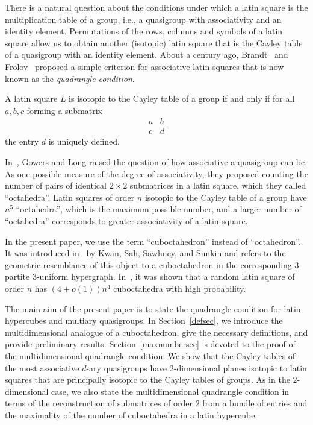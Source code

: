 \documentclass[a4paper]{article}
\begin{document}
There  is a natural question about the conditions under which a latin square is the multiplication table of a group, i.e., a quasigroup with associativity  and an identity element. Permutations of the rows, columns and symbols of a latin square  allow us to obtain another (isotopic) latin square that is the Cayley table of a quasigroup with an identity element.  About  a century ago, Brandt~\cite{brandt.qudrangle}  and  Frolov~\cite{frolov.groupCayley}  proposed a  simple criterion for associative latin squares that is now known as the \textit{quadrangle condition}. 
  
  
  
  
\begin{theorem} \label{BrandtFrolovthm}
A latin square $L$ is isotopic to the Cayley table of a group if and only if for all $a,b,c$ forming a  submatrix
$$
\begin{array}{cc}
a & b \\ c & d
\end{array}
$$
the entry $d$ is uniquely defined.
\end{theorem}


In~\cite{GowLong.approxgroups}, Gowers and Long raised the question of how associative a quasigroup  can be. As one possible measure of the degree of associativity, they proposed counting the number of pairs of identical $2 \times 2$ submatrices in a latin square, which they called ``octahedra''. Latin squares of order $n$  isotopic to the Cayley table of a group have $n^5$ ``octahedra'', which is the maximum possible number, and a larger number of ``octahedra''  corresponds to greater  associativity of a latin square.  

In the present paper, we use the term ``cuboctahedron'' instead of ``octahedron''. It was introduced in~\cite{KwanSahSaw.SubstrctLS}  by Kwan, Sah, Sawhney, and Simkin and refers to the  geometric  resemblance of this object  to a cuboctahedron in the corresponding $3$-partite $3$-uniform hypergraph.  In~\cite{KwanSahSaw.SubstrctLS},  it  was  shown that a random latin square of order $n$ has $ (4 + o (1))n^4$ cuboctahedra with high probability. 


The main aim of the present paper is to state the quadrangle condition for latin hypercubes and multiary quasigroups.   In Section~\ref{defsec}, we introduce the multidimensional analogue of a cuboctahedron,  give the necessary definitions, and provide preliminary results. Section~\ref{maxnumbersec} is devoted to the proof of the multidimensional  quadrangle condition.  We  show that the Cayley tables of the  most associative  $d$-ary quasigroups  have  $2$-dimensional planes  isotopic to latin squares that are principally isotopic to the Cayley tables of groups.  As in the $2$-dimensional case, we also state the multidimensional quadrangle condition  in terms of  the reconstruction of  submatrices of order $2$ from a bundle of  entries and    the maximality of the number of cuboctahedra in a latin hypercube. 
\end{document}
